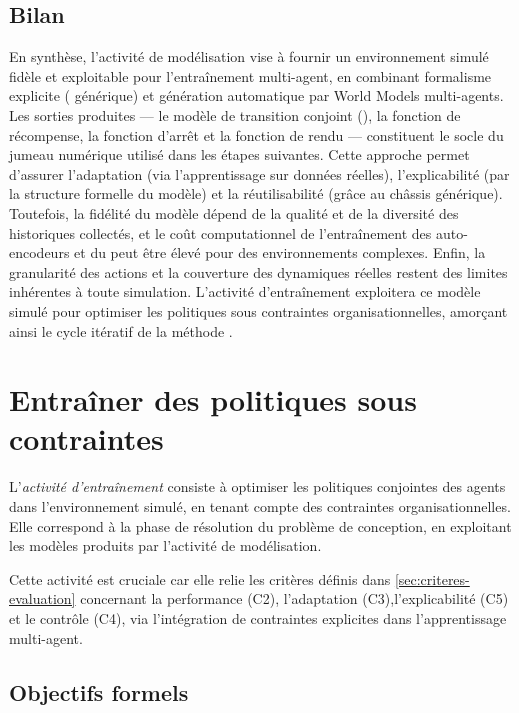 \section{Bilan}

\noindent
En synthèse, l'activité de modélisation vise à fournir un environnement simulé fidèle et exploitable pour l'entraînement multi-agent, en combinant formalisme explicite ( générique) et génération automatique par World Models multi-agents. Les sorties produites — le modèle de transition conjoint (), la fonction de récompense, la fonction d'arrêt et la fonction de rendu — constituent le socle du jumeau numérique utilisé dans les étapes suivantes. Cette approche permet d'assurer l'adaptation (via l'apprentissage sur données réelles), l'explicabilité (par la structure formelle du modèle) et la réutilisabilité (grâce au châssis générique). Toutefois, la fidélité du modèle dépend de la qualité et de la diversité des historiques collectés, et le coût computationnel de l'entraînement des auto-encodeurs et du  peut être élevé pour des environnements complexes. Enfin, la granularité des actions et la couverture des dynamiques réelles restent des limites inhérentes à toute simulation. L'activité d'entraînement exploitera ce modèle simulé pour optimiser les politiques sous contraintes organisationnelles, amorçant ainsi le cycle itératif de la méthode .

\clearpage
\thispagestyle{empty}
\null
\newpage

\chapter{Entraîner des politiques sous contraintes}
\label{chap:training}

L'\textit{activité d'entraînement} consiste à optimiser les politiques conjointes des agents dans l'environnement simulé, en tenant compte des contraintes organisationnelles.
Elle correspond à la phase de résolution du problème de conception, en exploitant les modèles produits par l'activité de modélisation.

Cette activité est cruciale car elle relie les critères définis dans \autoref{sec:criteres-evaluation} concernant la performance (C2), l'adaptation (C3),l'explicabilité (C5) et le contrôle (C4), via l'intégration de contraintes explicites dans l'apprentissage multi-agent.

\section*{Objectifs formels}

